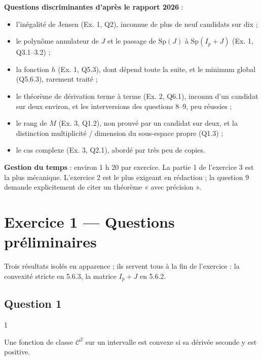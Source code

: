 \documentclass[11pt,a4paper]{article}
\providecommand{\tightlist}{\setlength{\itemsep}{0pt}\setlength{\parskip}{0pt}}
\begin{document}
\textbf{Questions discriminantes d'après le rapport 2026} :

\begin{itemize}
\tightlist
\item
  l'inégalité de Jensen (Ex. 1, Q2), inconnue de plus de neuf candidats sur dix ;
\item
  le polynôme annulateur de \(J\) et le passage de \(\mathrm{Sp}(J)\) à \(\mathrm{Sp}(I_p+J)\) (Ex. 1, Q3.1--3.2) ;
\item
  la fonction \(h\) (Ex. 1, Q5.3), dont dépend toute la suite, et le minimum global (Q5.6.3), rarement traité ;
\item
  le théorème de dérivation terme à terme (Ex. 2, Q6.1), inconnu d'un candidat sur deux environ, et les interversions des questions 8--9, peu réussies ;
\item
  le rang de \(M\) (Ex. 3, Q1.2), non prouvé par un candidat sur deux, et la distinction multiplicité / dimension du sous-espace propre (Q1.3) ;
\item
  le cas complexe (Ex. 3, Q2.1), abordé par très peu de copies.
\end{itemize}

\textbf{Gestion du temps} : environ 1 h 20 par exercice. La partie 1 de l'exercice 3 est la plus mécanique. L'exercice 2 est le plus exigeant en rédaction ; la question 9 demande explicitement de citer un théorème « avec précision ».

\hypertarget{exercice-1-questions-pruxe9liminaires}{%
\section{Exercice 1 --- Questions préliminaires}\label{exercice-1-questions-pruxe9liminaires}}

Trois résultats isolés en apparence ; ils servent tous à la fin de l'exercice : la convexité stricte en 5.6.3, la matrice \(I_p+J\) en 5.6.2.

\hypertarget{question-1}{%
\subsection{Question 1}\label{question-1}}

\begin{indication}{1}

Une fonction de classe \(\mathcal C^2\) sur un intervalle est convexe si sa dérivée seconde y est positive.

\end{indication}
\end{document}
